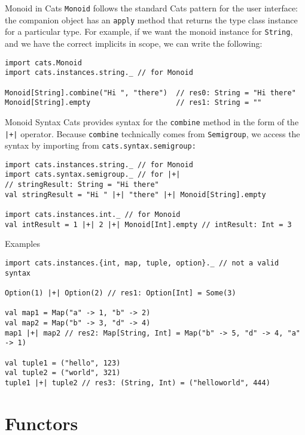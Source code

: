 \documentclass[aspectratio=169]{beamer}
\begin{document}
\begin{frame}[fragile]{Monoid in Cats}
\texttt{Monoid} follows the standard Cats pattern for the user interface: the companion object has
an \texttt{apply}
method that returns the type class instance for a particular type. For example, if we want the
monoid instance for \texttt{String}, and we have the correct implicits in scope, we can write the following:
\bigskip
\begin{verbatim}
import cats.Monoid
import cats.instances.string._ // for Monoid

Monoid[String].combine("Hi ", "there")  // res0: String = "Hi there"
Monoid[String].empty                    // res1: String = ""
\end{verbatim}
\end{frame}

\begin{frame}[fragile]{Monoid Syntax}
Cats provides syntax for the \texttt{combine} method in the form of the \texttt{|+|} operator.
Because \texttt{combine}
technically comes from \texttt{Semigroup}, we access the syntax by importing from \texttt{cats.syntax.semigroup:}
\bigskip
\begin{verbatim}
import cats.instances.string._ // for Monoid
import cats.syntax.semigroup._ // for |+|
// stringResult: String = "Hi there"
val stringResult = "Hi " |+| "there" |+| Monoid[String].empty 

import cats.instances.int._ // for Monoid
val intResult = 1 |+| 2 |+| Monoid[Int].empty // intResult: Int = 3
\end{verbatim}
\end{frame}

\begin{frame}[fragile]{Examples}
\begin{verbatim}
import cats.instances.{int, map, tuple, option}._ // not a valid syntax

Option(1) |+| Option(2) // res1: Option[Int] = Some(3)

val map1 = Map("a" -> 1, "b" -> 2)
val map2 = Map("b" -> 3, "d" -> 4)
map1 |+| map2 // res2: Map[String, Int] = Map("b" -> 5, "d" -> 4, "a" -> 1)

val tuple1 = ("hello", 123)
val tuple2 = ("world", 321)
tuple1 |+| tuple2 // res3: (String, Int) = ("helloworld", 444)
\end{verbatim}
\end{frame}

\section{Functors}
\end{document}
